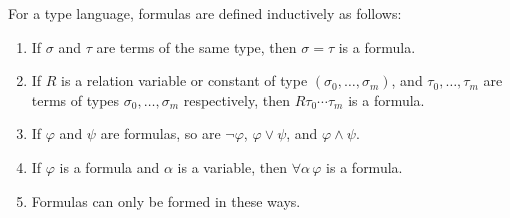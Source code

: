 For a type language, formulas are defined inductively as follows:

\begin{enumerate}
\item[(8)] If $\sigma$ and $\tau$ are terms of the same type, then $\sigma = \tau$ is a formula.
\item[(9)] If $R$ is a relation variable or constant of type $(\sigma_0, \ldots, \sigma_m)$, and $\tau_0, \ldots, \tau_m$ are terms of types $\sigma_0, \ldots, \sigma_m$ respectively, then $R\tau_0 \cdots \tau_m$ is a formula.
\item[(10)] If $\varphi$ and $\psi$ are formulas, so are $\neg\varphi$, $\varphi \lor \psi$, and $\varphi \land \psi$.
\item[(11)] If $\varphi$ is a formula and $\alpha$ is a variable, then $\forall\alpha\,\varphi$ is a formula.
\item[(12)] Formulas can only be formed in these ways.
\end{enumerate}
